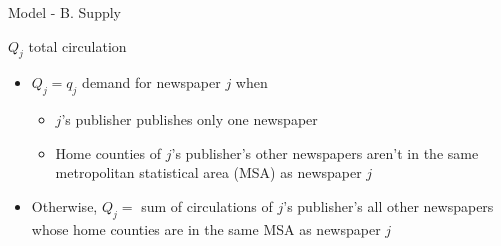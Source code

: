 \documentclass[aspectratio=169]{beamer}
\begin{document}
\begin{frame}{Model - B. Supply}
	
	$Q_j$ total circulation
	\begin{itemize}
		\item $Q_j = q_j$ demand for newspaper $j$ when
		\begin{itemize}
			\item $j$'s publisher publishes only one newspaper
			\item Home counties of $j$'s publisher's other newspapers aren't in the same metropolitan statistical area (MSA) as newspaper $j$
		\end{itemize}
		\item Otherwise, $Q_j = $ sum of circulations of $j$'s publisher's all other newspapers whose home counties are in the same MSA as newspaper $j$
	\end{itemize}

\end{frame}
\end{document}
